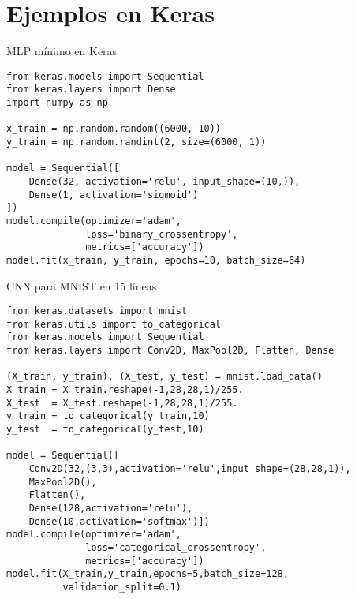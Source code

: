 \documentclass[12pt,spanish]{beamer}
\begin{document}
\section{Ejemplos en Keras}
\begin{frame}[fragile]{MLP mínimo en Keras}
  \begin{verbatim}
from keras.models import Sequential
from keras.layers import Dense
import numpy as np

x_train = np.random.random((6000, 10))
y_train = np.random.randint(2, size=(6000, 1))

model = Sequential([
    Dense(32, activation='relu', input_shape=(10,)),
    Dense(1, activation='sigmoid')
])
model.compile(optimizer='adam',
              loss='binary_crossentropy',
              metrics=['accuracy'])
model.fit(x_train, y_train, epochs=10, batch_size=64)
  \end{verbatim}
\end{frame}

\begin{frame}[fragile]{CNN para MNIST en 15 líneas}
  \begin{verbatim}
from keras.datasets import mnist
from keras.utils import to_categorical
from keras.models import Sequential
from keras.layers import Conv2D, MaxPool2D, Flatten, Dense

(X_train, y_train), (X_test, y_test) = mnist.load_data()
X_train = X_train.reshape(-1,28,28,1)/255.
X_test  = X_test.reshape(-1,28,28,1)/255.
y_train = to_categorical(y_train,10)
y_test  = to_categorical(y_test,10)

model = Sequential([
    Conv2D(32,(3,3),activation='relu',input_shape=(28,28,1)),
    MaxPool2D(),
    Flatten(),
    Dense(128,activation='relu'),
    Dense(10,activation='softmax')])
model.compile(optimizer='adam',
              loss='categorical_crossentropy',
              metrics=['accuracy'])
model.fit(X_train,y_train,epochs=5,batch_size=128,
          validation_split=0.1)
  \end{verbatim}
\end{frame}

\end{document}
